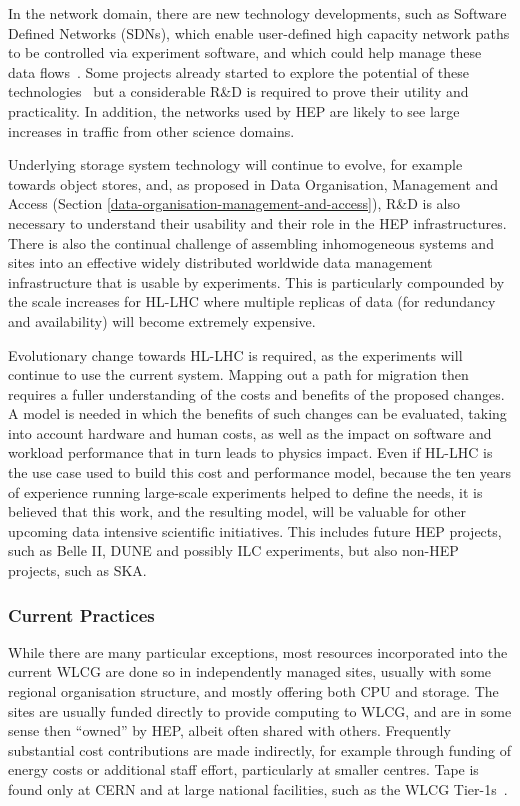 In the network domain, there are new technology developments, such as
Software Defined Networks (SDNs), which enable user-defined high
capacity network paths to be controlled via experiment software, and
which could help manage these data flows~\cite{Blikra:2221659}.
Some projects already started
to explore the potential of these technologies~\cite{OSiRIS} but a
considerable R\&D is required to prove their utility and practicality.
In addition,
the networks used by HEP are likely to see large increases in traffic
from other science domains.

Underlying storage system technology will continue to evolve, for
example towards object stores, and, as proposed in
Data Organisation, Management and Access
(Section \ref{data-organisation-management-and-access}),
R\&D is also necessary to understand their usability and their role in
the HEP infrastructures. There is also the continual challenge of
assembling inhomogeneous systems and sites into an effective widely
distributed worldwide data management infrastructure that is usable by
experiments. This is particularly compounded by the scale increases for
HL-LHC where multiple replicas of data (for redundancy and availability)
will become extremely expensive.

Evolutionary change towards HL-LHC is required, as the experiments will
continue to use the current system. Mapping out a path for migration
then requires a fuller understanding of the costs and benefits of the
proposed changes. A model is needed in which the benefits of such
changes can be evaluated, taking into account hardware and human costs,
as well as the impact on software and workload performance that in turn
leads to physics impact. Even if HL-LHC is the use case used to build
this cost and performance model, because the ten years of experience
running large-scale experiments helped to define the needs, it is
believed that this work, and the resulting model, will be valuable for
other upcoming data intensive scientific initiatives. This includes
future HEP projects, such as Belle II, DUNE and possibly ILC
experiments, but also non-HEP projects, such as SKA.

\subsubsection*{Current Practices}

While there are many particular exceptions, most resources incorporated
into the current WLCG are done so in independently managed sites,
usually with some regional organisation structure, and mostly offering
both CPU and storage. The sites are usually funded directly to provide
computing to WLCG, and are in some sense then ``owned'' by HEP, albeit
often shared with others. Frequently substantial cost contributions are
made indirectly, for example through funding of energy costs or
additional staff effort, particularly at smaller centres. Tape is found
only at CERN and at large national facilities, such as the WLCG Tier-1s~\cite{Bird:1695401}.

